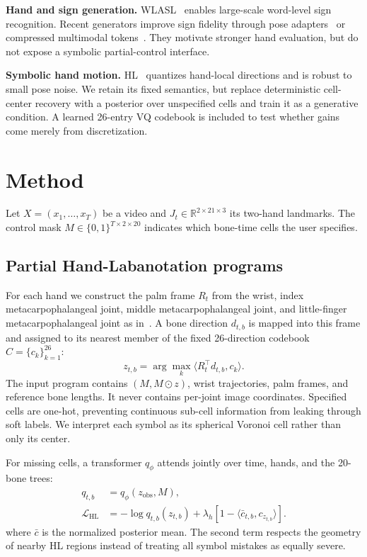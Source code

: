 \documentclass{article}
\begin{document}
\textbf{Hand and sign generation.}
WLASL~\cite{wlasl} enables large-scale word-level sign recognition.  Recent
generators improve sign fidelity through pose adapters~\cite{signrefine} or
compressed multimodal tokens~\cite{signvip}.  They motivate stronger hand
evaluation, but do not expose a symbolic partial-control interface.

\textbf{Symbolic hand motion.}
HL~\cite{li2024hl} quantizes hand-local directions and is robust to small pose
noise.  We retain its fixed semantics, but replace deterministic cell-center
recovery with a posterior over unspecified cells and train it as a generative
condition.  A learned 26-entry VQ codebook is included to test whether gains
come merely from discretization.

\section{Method}
\label{sec:method}
Let $X=(x_1,\ldots,x_T)$ be a video and $J_t\in\mathbb{R}^{2\times21\times3}$
its two-hand landmarks.  The control mask $M\in\{0,1\}^{T\times2\times20}$
indicates which bone-time cells the user specifies.

\subsection{Partial Hand-Labanotation programs}
For each hand we construct the palm frame $R_t$ from the wrist, index
metacarpophalangeal joint, middle metacarpophalangeal joint, and little-finger
metacarpophalangeal joint as in~\cite{li2024hl}.  A bone direction $d_{t,b}$ is
mapped into this frame and assigned to its nearest member of the fixed
26-direction codebook $C=\{c_k\}_{k=1}^{26}$:
\begin{equation}
 z_{t,b}=\arg\max_k\langle R_t^\top d_{t,b},c_k\rangle .
\end{equation}
The input program contains $(M,M\odot z)$, wrist trajectories, palm
frames, and reference bone lengths.  It never contains per-joint image
coordinates. Specified cells are one-hot, preventing continuous sub-cell
information from leaking through soft labels. We interpret each symbol as its
spherical Voronoi cell rather than only its center.

For missing cells, a transformer $q_\phi$ attends jointly over time, hands,
and the 20-bone trees:
\begin{equation}
\begin{aligned}
 q_{t,b}&=q_\phi(z_{\mathrm{obs}},M),\\
 \mathcal L_{\mathrm{HL}}&=-\log q_{t,b}(z_{t,b})
 +\lambda_h[1-\langle\bar c_{t,b},c_{z_{t,b}}\rangle].
\end{aligned}
\end{equation}
where $\bar c$ is the normalized posterior mean.  The second term respects
the geometry of nearby HL regions instead of treating all symbol mistakes as
equally severe.
\end{document}
